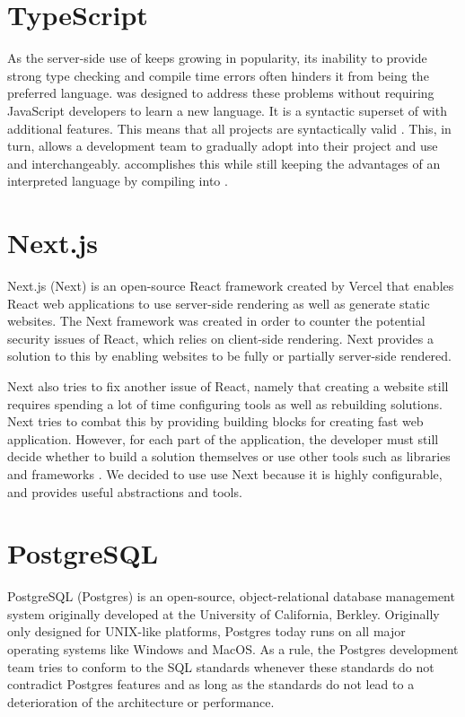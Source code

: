 \section*{TypeScript}
As the server-side use of \javascript{} keeps growing in popularity, its inability to provide strong type checking and compile time errors often hinders it from being the preferred language.
\typescript{} was designed to address these problems without requiring JavaScript developers to learn a new language.
It is a syntactic superset of \javascript{} with additional features.
This means that all \javascript{} projects are syntactically valid \typescript{}. This, in turn, allows a development team to gradually adopt \typescript{} into their project and use \typescript{} and \javascript{} interchangeably\cite{TypeScript}.
\typescript{} accomplishes this while still keeping the advantages of an interpreted language by compiling into \javascript{}.

\section*{Next.js}
Next.js (Next) is an open-source React framework created by Vercel that enables React web applications to use server-side rendering as well as generate static websites. The Next framework was created in order to counter the potential security issues of React, which relies on client-side rendering. Next provides a solution to this by enabling websites to be fully or partially server-side rendered\cite {Nextjs_Docks}.

Next also tries to fix another issue of React, namely that creating a website still requires spending a lot of time configuring tools as well as rebuilding solutions.
Next tries to combat this by providing building blocks for creating fast web application.
However, for each part of the application, the developer must still decide whether to build a solution themselves or use other tools such as libraries and frameworks \cite{Nextjs_Docks}.
We decided to use use Next because it is highly configurable, and provides useful abstractions and tools.

\section*{PostgreSQL}
PostgreSQL (Postgres) is an open-source, object-relational database management system originally developed at the University of California, Berkley. Originally only designed for UNIX-like platforms, Postgres today runs on all major operating systems like Windows and MacOS\cite{Postgres_Docs}.
As a rule, the Postgres development team tries to conform to the SQL standards whenever these standards do not contradict Postgres features and as long as the standards do not lead to a deterioration of the architecture or performance\cite{Postgres_Docs}.

